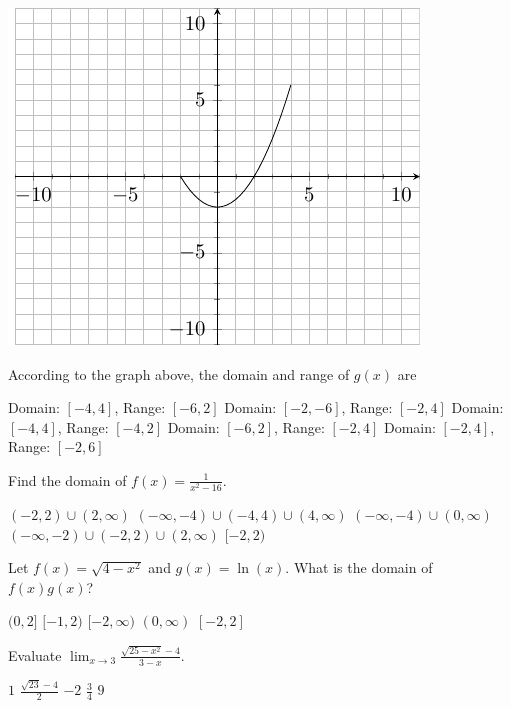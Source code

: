 \documentclass[11pt]{article}
\begin{document}
\begin{questions}
\begin{multiplechoice}{5}
\begin{minipage}{\linewidth}%
\centering
\makebox[\linewidth]{}
\includegraphics{exam1graph2.pdf}
\label{graph2exam1}%
\end{minipage}
According to the graph above, the domain and range of $g(x)$ are
\begin{answers}{2}
\ans Domain: $[-4,4]$, Range: $[-6,2]$
\ans Domain: $[-2,-6]$, Range: $[-2,4]$
\ans Domain: $[-4,4]$, Range: $[-4,2]$
\ans Domain: $[-6,2]$, Range: $[-2,4]$
\ans Domain: $[-2,4]$, Range: $[-2,6]$
\end{answers}

\question Find the domain of $f(x) = \frac{1}{x^2 - 16}$.
\begin{answers}{2}
\ans $(-2,2) \cup (2, \infty)$
\ans $(-\infty, -4) \cup (-4,4) \cup (4, \infty) $
\ans  $(-\infty, -4) \cup (0, \infty)$
\ans  $(-\infty, -2) \cup (-2,2) \cup (2, \infty)$
\ans $[-2,2)$
\end{answers}


\question Let $f(x) = \sqrt{4-x^2}$ and $g(x)=\ln(x)$.  What is the domain of $f(x)g(x)$?
\begin{answers}{2}
\ans $(0,2]$
\ans $[-1,2)$
\ans $[-2,\infty)$
\ans $(0,\infty)$
\ans $[-2,2]$
\end{answers}

\newpage


\question Evaluate $\displaystyle \lim_{x \to 3} \frac{\sqrt{25-x^2} - 4}{3-x}$.
\begin{answers}{3}
\ans $1$
\ans $\frac{\sqrt{23} - 4}{2}$
\ans $-2$
\ans $\frac{3}{4}$
\ans $9$
\end{answers}




\end{multiplechoice}
\end{questions}
\end{document}
